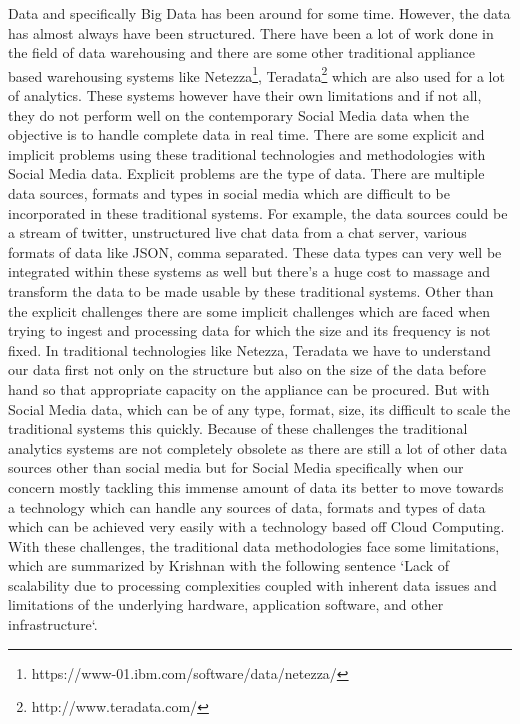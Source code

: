 \documentclass[sigconf]{acmart}
\begin{document}
Data and specifically Big Data has been around for some time. However, the data has almost always have been structured. There have been a lot of work done in the field of data warehousing and there are some other traditional appliance based warehousing systems like Netezza\footnote{https://www-01.ibm.com/software/data/netezza/}, Teradata\footnote{http://www.teradata.com/} which are also used for a lot of analytics. These systems however have their own limitations and if not all, they do not perform well on the contemporary Social Media data\cite{sebabigdata} when the objective is to handle complete data in real time. There are some explicit and implicit problems using these traditional technologies and methodologies with Social Media data. Explicit problems are the type of data. There are multiple data sources, formats and types in social media which are difficult to be incorporated in these traditional systems. For example, the data sources could be a stream of twitter, unstructured live chat data from a chat server, various formats of data like JSON, comma separated. These data types can very well be integrated within these systems as well but there's a huge cost to massage and transform the data to be made usable by these traditional systems. Other than the explicit challenges there are some implicit challenges which are faced when trying to ingest and processing data for which the size and its frequency is not fixed. In traditional technologies like Netezza, Teradata we have to understand our data first not only on the structure but also on the size of the data before hand so that appropriate capacity on the appliance can be procured. But with Social Media data, which can be of any type, format, size, its difficult to scale the traditional systems this quickly\cite{georgevirthadoop}. Because of these challenges the traditional analytics systems are not completely obsolete as there are still a lot of other data sources other than social media but for Social Media specifically when our concern mostly tackling this immense amount of data its better to move towards a technology which can handle any sources of data, formats and types of data which can be achieved very easily with a technology based off Cloud Computing. With these challenges, the traditional data methodologies face some limitations, which are summarized by Krishnan with the following sentence `Lack of scalability due to processing complexities coupled with inherent data issues and limitations of the underlying hardware, application software, and other infrastructure`\cite{krishnan}.
\end{document}

